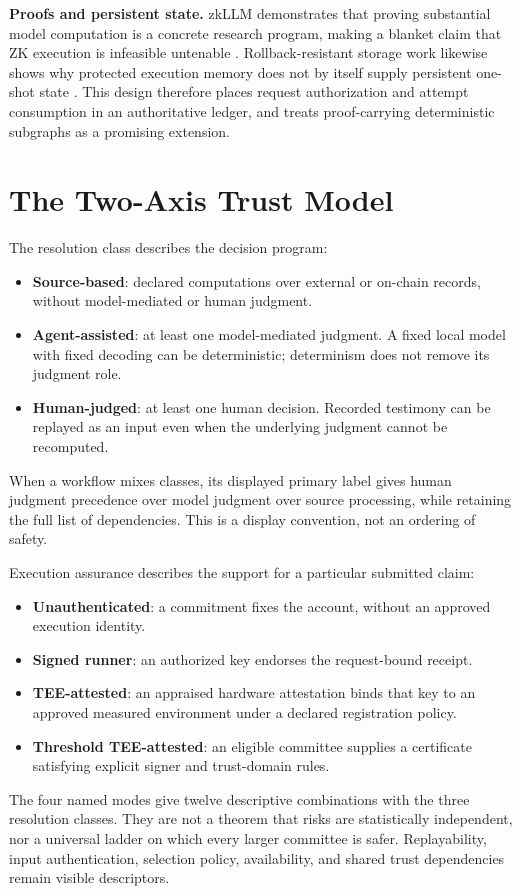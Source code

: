 \textbf{Proofs and persistent state.} zkLLM demonstrates that proving substantial model computation is a concrete research program, making a blanket claim that ZK execution is infeasible untenable \cite{zkllm2024}. Rollback-resistant storage work likewise shows why protected execution memory does not by itself supply persistent one-shot state \cite{teerex2026}. This design therefore places request authorization and attempt consumption in an authoritative ledger, and treats proof-carrying deterministic subgraphs as a promising extension.

\section{The Two-Axis Trust Model}
\label{sec:twoaxis}

The resolution class describes the decision program:
\begin{itemize}
\item \textbf{Source-based}: declared computations over external or on-chain records, without model-mediated or human judgment.
\item \textbf{Agent-assisted}: at least one model-mediated judgment. A fixed local model with fixed decoding can be deterministic; determinism does not remove its judgment role.
\item \textbf{Human-judged}: at least one human decision. Recorded testimony can be replayed as an input even when the underlying judgment cannot be recomputed.
\end{itemize}
When a workflow mixes classes, its displayed primary label gives human judgment precedence over model judgment over source processing, while retaining the full list of dependencies. This is a display convention, not an ordering of safety.

Execution assurance describes the support for a particular submitted claim:
\begin{itemize}
\item \textbf{Unauthenticated}: a commitment fixes the account, without an approved execution identity.
\item \textbf{Signed runner}: an authorized key endorses the request-bound receipt.
\item \textbf{TEE-attested}: an appraised hardware attestation binds that key to an approved measured environment under a declared registration policy.
\item \textbf{Threshold TEE-attested}: an eligible committee supplies a certificate satisfying explicit signer and trust-domain rules.
\end{itemize}
The four named modes give twelve descriptive combinations with the three resolution classes. They are not a theorem that risks are statistically independent, nor a universal ladder on which every larger committee is safer. Replayability, input authentication, selection policy, availability, and shared trust dependencies remain visible descriptors.

